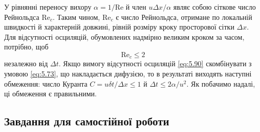 У рівнянні переносу вихору $\alpha = 1 / \text{Re}$ й член $u \Delta x / \alpha$ являє собою сіткове число Рейнольдса $\text{Re}_c$. Таким чином, $\text{Re}_c$ є число Рейнольдса, отримане по локальній швидкості й характерній довжині, рівній розміру кроку просторової сітки $\Delta x$. Для відсутності осциляцій, обумовлених надмірно великим кроком за часом, потрібно, щоб
\begin{equation}
    \label{eq:5.91}
    \text{Re}_c \le 2
\end{equation}
незалежно від $\Delta t$. Якщо вимогу відсутності осциляцій \eqref{eq:5.90} скомбінувати з умовою \eqref{eq:5.73}, що накладається дифузією, то в результаті виходять наступні обмеження: число Куранта $C = u \delta t / \Delta x \le 1$ й $\Delta t \le 2 \alpha / u^2$. Як побачимо надалі, ці обмеження є правильними.

\subsection{Завдання для самостійної роботи}

